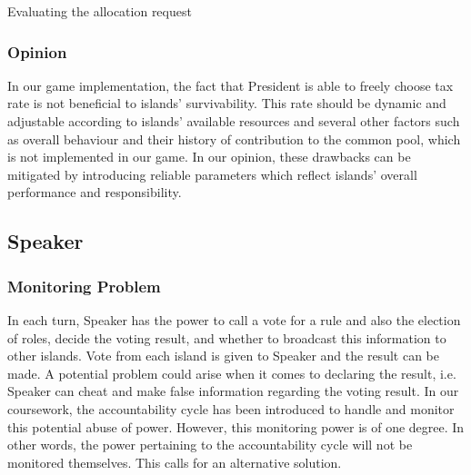 \begin{algorithm}[!htb]
\SetAlgoLined
    \caption{Evaluating the allocation request}
\end{algorithm}

\subsubsection{Opinion} \label{subsubsec:Team6_President:Opinion}
In our game implementation, the fact that President is able to freely choose tax rate is not beneficial to islands’ survivability. This rate should be dynamic and adjustable according to islands’ available resources and several other factors such as overall behaviour and their history of contribution to the common pool, which is not implemented in our game. In our opinion, these drawbacks can be mitigated by introducing reliable parameters which reflect islands’ overall performance and responsibility.

\subsection{Speaker} \label{subsec:Team6_Speaker}
\subsubsection{Monitoring Problem} \label{subsubsec:Team6_Speaker:Problem}
In each turn, Speaker has the power to call a vote for a rule and also the election of roles, decide the voting result, and whether to broadcast this information to other islands. Vote from each island is given to Speaker and the result can be made.
A potential problem could arise when it comes to declaring the result, i.e. Speaker can cheat and make false information regarding the voting result. In our coursework, the accountability cycle has been introduced to handle and monitor this potential abuse of power. However, this monitoring power is of one degree. In other words, the power pertaining to the accountability cycle will not be monitored themselves. This calls for an alternative solution.

